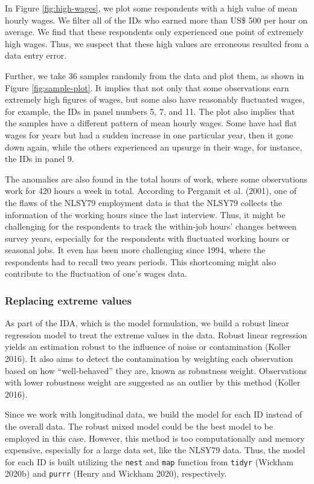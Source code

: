 \documentclass[12pt]{article}
\begin{document}
In Figure \ref{fig:high-wages}, we plot some respondents with a high value of mean hourly wages. We filter all of the IDs who earned more than US\$ 500 per hour on average. We find that these respondents only experienced one point of extremely high wages. Thus, we suspect that these high values are erroneous resulted from a data entry error.

Further, we take 36 samples randomly from the data and plot them, as shown in Figure \ref{fig:sample-plot}. It implies that not only that some observations earn extremely high figures of wages, but some also have reasonably fluctuated wages, for example, the IDs in panel numbers 5, 7, and 11. The plot also implies that the samples have a different pattern of mean hourly wages. Some have had flat wages for years but had a sudden increase in one particular year, then it gone down again, while the others experienced an upsurge in their wage, for instance, the IDs in panel 9.

The anomalies are also found in the total hours of work, where some observations work for 420 hours a week in total. According to Pergamit et al. (2001), one of the flaws of the NLSY79 employment data is that the NLSY79 collects the information of the working hours since the last interview. Thus, it might be challenging for the respondents to track the within-job hours' changes between survey years, especially for the respondents with fluctuated working hours or seasonal jobs. It even has been more challenging since 1994, where the respondents had to recall two years periods. This shortcoming might also contribute to the fluctuation of one's wages data.

\hypertarget{replacing-extreme-values}{%
\subsubsection{Replacing extreme values}\label{replacing-extreme-values}}

As part of the IDA, which is the model formulation, we build a robust linear regression model to treat the extreme values in the data. Robust linear regression yields an estimation robust to the influence of noise or contamination (Koller 2016). It also aims to detect the contamination by weighting each observation based on how ``well-behaved'' they are, known as robustness weight. Observations with lower robustness weight are suggested as an outlier by this method (Koller 2016).

Since we work with longitudinal data, we build the model for each ID instead of the overall data. The robust mixed model could be the best model to be employed in this case. However, this method is too computationally and memory expensive, especially for a large data set, like the NLSY79 data. Thus, the model for each ID is built utilizing the \texttt{nest} and \texttt{map} function from \texttt{tidyr} (Wickham 2020b) and \texttt{purrr} (Henry and Wickham 2020), respectively.
\end{document}
